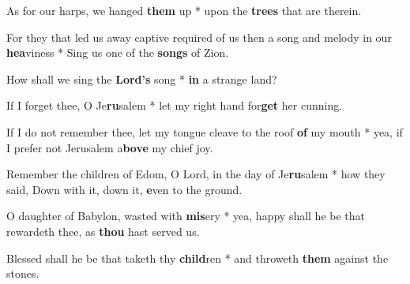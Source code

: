 \begin{multicols}{2}
	As for our harps, we hanged \textbf{them} up * upon the \textbf{trees} that are therein.
	
	For they that led us away captive required of us then a song and melody in our \textbf{hea}viness * Sing us one of the \textbf{songs} of Zion.
	
	How shall we sing the \textbf{Lord's} song * \textbf{in} a strange land?
	
	If I forget thee, O Je\textbf{ru}salem * let my right hand for\textbf{get} her cunning.
	
	If I do not remember thee, let my tongue cleave to the roof \textbf{of} my mouth * yea, if I prefer not Jerusalem a\textbf{bove} my chief joy.
	
	Remember the children of Edom, O Lord, in the day of Je\textbf{ru}salem * how they said, Down with it, down it, \textbf{e}ven to the ground.
	
	O daughter of Babylon, wasted with \textbf{mis}ery * yea, happy shall he be that rewardeth thee, as \textbf{thou} hast served us.
	
	Blessed shall he be that taketh thy \textbf{child}ren * and throweth \textbf{them} against the stones.
\end{multicols}